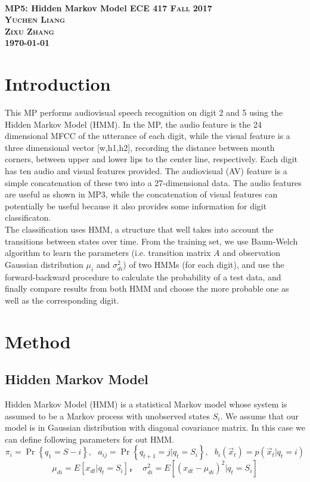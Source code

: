 \documentclass{article}
\begin{document}
	\everymath{\displaystyle}
	\begin{titlepage}	 	
		\center
		\text{}\\[3cm]
		\linespread{2}\huge \bfseries MP5: Hidden Markov Model
		\center\textsc{\Large ECE 417 Fall 2017}\\[1cm]
		\Large\center\textsc{Yuchen Liang\\ Zixu Zhang  }\\[1.4cm]
		\Large \today\\
		\vfill
	\end{titlepage}
	\setlength{\baselineskip}{24pt}
	
	\section{Introduction}
	This MP performs audiovisual speech recognition on digit 2 and 5 using the Hidden Markov Model (HMM). In the MP, the audio feature is the 24 dimensional MFCC of the utterance of each digit, while the visual feature is a three dimensional vector [w,h1,h2], recording the distance between mouth corners, between upper and lower lips to the center line, respectively. Each digit has ten audio and visual features provided. The audiovisual (AV) feature is a simple concatenation of these two into a 27-dimensional data. The audio features are useful as shown in MP3, while the concatenation of visual features can potentially be useful because it also provides some information for digit classificaton.\\
	The classification uses HMM, a structure that well takes into account the transitions between states over time. From the training set, we use Baum-Welch algorithm to learn the parameters (i.e. transition matrix $A$ and observation Gaussian distribution $\mu_i$ and $\sigma_{di}^2$) of two HMMs (for each digit), and use the forward-backward procedure to calculate the probability of a test data, and finally compare results from both HMM and choose the more probable one as well as the corresponding digit.
	
	\section{Method}
	\subsection{Hidden Markov Model}
	Hidden Markov Model (HMM) is a statistical Markov model whose system is assumed to be a Markov process with unobserved states $S_i$. We assume that our model is in Gaussian distribution with diagonal covariance matrix. In this case we can define following parameters for out HMM.
	$$\pi_i=\Pr\left\{q_1=S-i\right\},~~~a_{ij}=\Pr\left\{q_{t+1}=j|q_t=S_i\right\},~~~b_i(\vec{x}_t)=p(\vec{x}_t|q_t=i)$$
	$$\mu_{di}=E\left[x_{dt}|q_t=S_i\right]，~~~\sigma_{di}^2=E\left[(x_{dt}-\mu_{di})^2|q_t=S_i\right]$$
\end{document}
